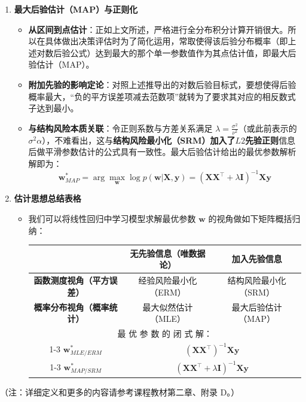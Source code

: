 \documentclass{article}
\theoremstyle{remark}
\theoremstyle{definition}
\theoremstyle{plain}
\numberwithin {equation}{section}
\numberwithin{assumption}{section}
\begin{document}
\begin{enumerate}
    \item \textbf{最大后验估计（MAP）与正则化}
    \begin{itemize}
        \item \textbf{从区间到点估计}：正如上文所述，严格进行全分布积分计算开销很大。所以在具体做出决策评估时为了简化运用，常取使得该后验分布概率（即上述对数后验公式）达到最大的那个单一参数值作为其点估计值，即最大后验估计（MAP）。
        \item \textbf{附加先验的影响定论}：对照上述推导出的对数后验目标式，要想使得后验概率最大，“负的平方误差项减去范数项”就转为了要求其对应的相反数式子达到最小。
        \item \textbf{与结构风险本质关联}：令正则系数与方差关系满足 $\lambda = \frac{\sigma^2}{\nu^2}$（或此前表示的 $\sigma^2 \alpha$），不难看出，这与\textbf{结构风险最小化（SRM）加入了$L2$先验正则}信息后做平滑参数估计的公式具有一致性。最大后验估计给出的最优参数解析解即为：
        \begin{equation*}
        \boldsymbol{w}^*_{MAP} = \arg\max_{\boldsymbol{w}} \log p(\boldsymbol{w}|\boldsymbol{X}, \boldsymbol{y}) = (\boldsymbol{X}\boldsymbol{X}^\top + \lambda \boldsymbol{I})^{-1}\boldsymbol{X}\boldsymbol{y}
        \end{equation*}
    \end{itemize}

    \item \textbf{估计思想总结表格}
    \begin{itemize}
        \item 我们可以将线性回归中学习模型求解最优参数 $\boldsymbol{w}$ 的视角做如下矩阵概括归纳：
        \vspace{1em}
        \begin{center}
        \begin{tabular}{|c|c|c|}
        \hline
        & \textbf{无先验信息（唯数据论）} & \textbf{加入先验信息} \\
        \hline
        \textbf{函数测度视角（平方误差）} & 经验风险最小化（ERM） & 结构风险最小化（SRM） \\
        \hline
        \textbf{概率分布视角（概率统计）} & 最大似然估计（MLE） & 最大后验估计（MAP） \\
        \hline
        \multicolumn{3}{|c|}{最  优  参  数  的  闭  式  解：} \\
        \cline{1-3}
            $\boldsymbol{w}^*_{MLE / ERM}$ & \multicolumn{2}{c|}{$(\boldsymbol{X}\boldsymbol{X}^\top)^{-1}\boldsymbol{X}\boldsymbol{y}$} \\
        \cline{1-3}
            $\boldsymbol{w}^*_{MAP / SRM}$ & \multicolumn{2}{c|}{$(\boldsymbol{X}\boldsymbol{X}^\top + \lambda \boldsymbol{I})^{-1}\boldsymbol{X}\boldsymbol{y}$} \\
        \hline
        \end{tabular}
        \end{center}
    \end{itemize}
\end{enumerate}

（注：详细定义和更多的内容请参考课程教材第二章、附录 D。）
\end{document}
